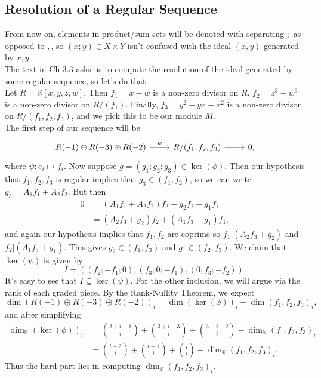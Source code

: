 \documentclass{article}
\theoremstyle{definition}
\newcommand{\K}{\mathbb{K}}
\begin{document}
\subsection*{Resolution of a Regular Sequence}

From now on, elements in product/sum sets will be denoted with separating $;$
as opposed to $,$, so $(x;y) \in X \times Y$ isn't confused with the ideal $(x,
y)$ generated by $x, y$. \\

The text in Ch 3.3 asks us to compute the resolution of the ideal 
generated by some regular sequence, so let's do that. \\

Let $R = \K[x,y,z,w]$. Then $f_1 = x - w$ is a non-zero divisor on $R$. $f_2 =
z^3 - w^3$ is a non-zero divisor on $R/(f_1)$. Finally, $f_3 = y^2 + yx + x^2$ is a
non-zero divisor on $R/(f_1, f_2 ,f_3)$, and we pick this to be our module $M$.
\\

The first step of our sequence will be
\[
\begin{tikzcd}
  R(-1) \oplus R(-3) \oplus R(-2)
  \arrow[r, "\psi"] & 
  R / (f_1, f_2, f_3)
  \ar[r] & 
  0,
\end{tikzcd}
\] 
where $\psi : e_i \mapsto f_i$. Now suppose $g = (g_1; g_2; g_3) \in
\ker(\phi)$. Then our hypothesis that $f_1,f_2,f_3$ is regular implies that
$g_3 \in (f_1, f_2)$, so we can write $g_3 = A_1 f_1 + A_2 f_2$. But then 
\begin{align*}
	0 
	&= 
	(A_1 f_1 + A_2 f_2)f_3 + g_2 f_2 + g_1 f_1 \\
	&= 
	(A_2 f_3 + g_2) f_2 + (A_1 f_3 + g_1) f_1,
\end{align*} 
and again our hypothesis implies that $f_1, f_2$ are coprime so $f_1 | (A_2 f_3
+ g_2)$ and $f_2 | (A_1 f_3 + g_1)$. This gives $g_2 \in (f_1, f_3)$ and $g_1
\in (f_2, f_3)$. We claim that $\ker(\psi)$ is given by
\[
	I 
	= 
	\left(
		(f_2; -f_1; 0), 
		(f_3; 0; -f_1), 
		(0; f_3; -f_2)
	\right).
\]
It's easy to see that $I \subseteq \ker(\psi)$. For the other inclusion,
we will argue via the rank of each graded piece. By the Rank-Nullity
Theorem, we expect 
\[
	\dim (R(-1) \oplus R(-3) \oplus R(-2))_i
	=
	\dim (\ker(\phi))_i
	+
	\dim (f_1, f_2, f_3)_i,
\] 
and after simplifying
\begin{align*}
	\dim_{\K} (\ker(\phi))_i
	&=
	\binom{3 + i - 1}{i}
	+
	\binom{3 + i - 3}{i}
	+
	\binom{3 + i - 2}{i}
	-
	\dim_{\K} (f_1, f_2, f_3)_i \\
	&=
	\binom{i + 2}{i}
	+
	\binom{i + 1}{i}
	+
	\binom{i}{i}
	-
	\dim_{\K} (f_1, f_2, f_3)_i.
\end{align*} 
Thus the hard part lies in computing $\dim_{\K}(f_1,f_2,f_3)_i$.
\end{document}
